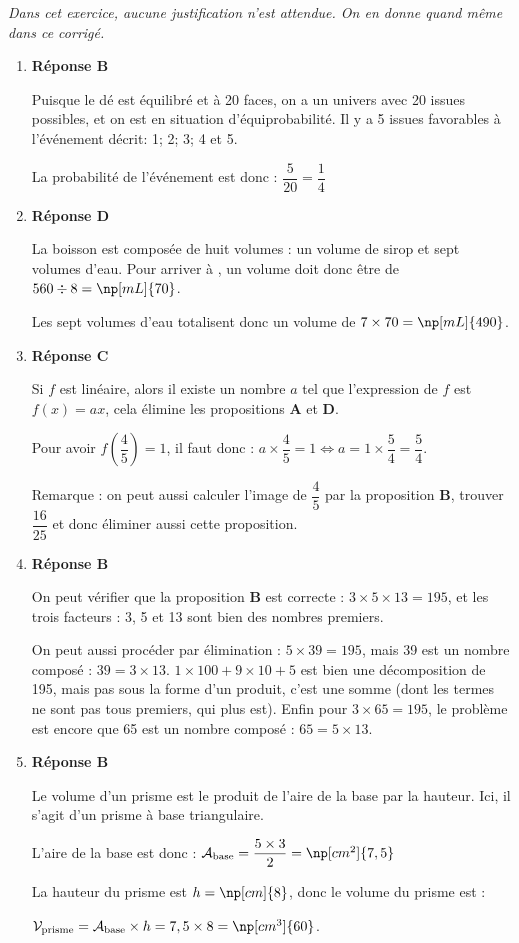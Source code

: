 
\medskip

\emph{Dans cet exercice, aucune justification n'est attendue. On en donne quand même dans ce corrigé.}


\begin{enumerate}
	\item \textbf{Réponse B}

	Puisque le dé est équilibré et à 20 faces, on a un univers avec 20 issues possibles, et on est en situation d'équiprobabilité. Il y a 5 issues favorables à l'événement décrit: 1; 2; 3; 4 et 5.

	La probabilité de l'événement est donc : $ \dfrac{5}{20} = \dfrac{1}{4} $

	\item \textbf{Réponse D}

	La boisson est composée de huit volumes : un volume de sirop et sept volumes d'eau. Pour arriver à , un volume doit donc être de $560 \div 8 = \np[mL]{70}$.

	Les sept volumes d'eau totalisent donc un volume de $7 \times 70 = \np[mL]{490}$.

	\item \textbf{Réponse C}

	Si $f$ est linéaire, alors il existe un nombre $a$ tel que l'expression de $f$ est $f(x) = ax$, cela élimine les propositions \textbf{A} et \textbf{D}.

	Pour avoir $f\left(\dfrac{4}{5}\right)  = 1$, il faut donc : $a\times \dfrac{4}{5} = 1 \iff a = 1 \times \dfrac{5}{4} = \dfrac{5}{4}$.

	Remarque : on peut aussi calculer l'image de $ \dfrac{4}{5} $ par la proposition \textbf{B}, trouver $ \dfrac{16}{25} $ et donc éliminer aussi cette proposition.

	\item \textbf{Réponse B}

	On peut vérifier que la proposition \textbf{B} est correcte : $3 \times 5 \times 13 = 195$, et les trois facteurs : 3, 5 et 13 sont bien des nombres premiers.

	On peut aussi procéder par élimination : $5 \times 39 = 195$, mais 39 est un nombre composé : $39 = 3\times 13$. $1 \times 100 + 9\times 10 + 5$ est bien une décomposition de 195, mais pas sous la forme d'un produit, c'est une somme (dont les termes ne sont pas tous premiers, qui plus est).
	Enfin pour $3\times 65 = 195$, le problème est encore que 65 est un nombre composé : $65 = 5 \times 13$.

	\item \textbf{Réponse B}

	Le volume d'un prisme est le produit de l'aire de la base par la hauteur. Ici, il s'agit d'un prisme à base triangulaire.

	L'aire de la base est donc : $\mathcal{A}_\mathrm{base} = \dfrac{5 \times 3}{2} = \np[cm^2]{7,5}$

	La hauteur du prisme est $h =\np[cm]{8}$, donc le volume du prisme est :

	 $\mathcal{V}_\mathrm{prisme} = \mathcal{A}_\mathrm{base} \times h = 7,5 \times 8 = \np[cm^3]{60}$.
\end{enumerate}

\bigskip

